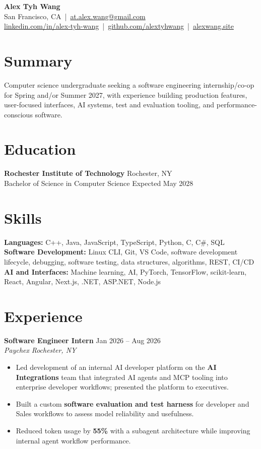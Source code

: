 \documentclass[10pt,letterpaper]{article}
\newif\ifresumeFirstRole
\newcommand{\resumeRole}[4]{%
  \ifresumeFirstRole
    \global\resumeFirstRolefalse
  \else
    \vspace{0pt plus 1fill}%
  \fi
  \textbf{#1} \hfill #2\\
  \textit{#3} \hfill \textit{#4}
}
\begin{document}
\begin{center}
{\Large \textbf{Alex Tyh Wang}}\\
San Francisco, CA \,|\, \href{mailto:at.alex.wang@gmail.com}{at.alex.wang@gmail.com}\\
\small \href{https://www.linkedin.com/in/alex-tyh-wang/}{linkedin.com/in/alex-tyh-wang} \,|\, \href{https://github.com/alextyhwang}{github.com/alextyhwang} \,|\, \href{https://alexwang.site}{alexwang.site}
\end{center}

\section*{Summary}
Computer science undergraduate seeking a software engineering internship/co-op for Spring and/or Summer 2027, with experience building production features, user-focused interfaces, AI systems, test and evaluation tooling, and performance-conscious software.

\section*{Education}
\textbf{Rochester Institute of Technology} \hfill Rochester, NY\\
Bachelor of Science in Computer Science \hfill Expected May 2028

\section*{Skills}
\textbf{Languages:} C++, Java, JavaScript, TypeScript, Python, C, C\#, SQL\\
\textbf{Software Development:} Linux CLI, Git, VS Code, software development lifecycle, debugging, software testing, data structures, algorithms, REST, CI/CD\\
\textbf{AI and Interfaces:} Machine learning, AI, PyTorch, TensorFlow, scikit-learn, React, Angular, Next.js, .NET, ASP.NET, Node.js

\section*{Experience}
\resumeRole{Software Engineer Intern}{Jan 2026 -- Aug 2026}{Paychex}{Rochester, NY}
\begin{itemize}
  \item Led development of an internal AI developer platform on the \textbf{AI Integrations} team that integrated AI agents and MCP tooling into enterprise developer workflows; presented the platform to executives.
  \item Built a custom \textbf{software evaluation and test harness} for developer and Sales workflows to assess model reliability and usefulness.
  \item Reduced token usage by \textbf{55\%} with a subagent architecture while improving internal agent workflow performance.
\end{itemize}
\end{document}
